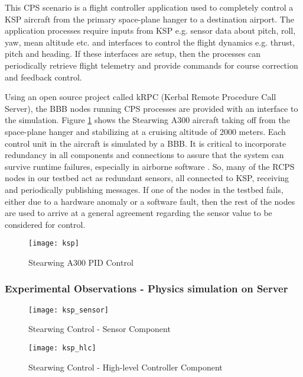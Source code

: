 This CPS scenario is a flight controller application used to completely control a KSP aircraft from the primary space-plane hanger to a destination airport. The application processes require inputs from KSP e.g. sensor data about pitch, roll, yaw, mean altitude etc. and interfaces to control the flight dynamics e.g. thrust, pitch and heading. If these interfaces are setup, then the processes can periodically retrieve flight telemetry and provide commands for course correction and feedback control.


Using an open source project called kRPC \cite{kRPC} (Kerbal Remote Procedure Call Server), the BBB nodes running CPS processes are provided with an interface to the simulation. Figure \ref{fig:ksp} shows the Stearwing A300 aircraft taking off from the space-plane hanger and stabilizing at a cruising altitude of 2000 meters. Each control unit in the aircraft is simulated by a BBB. It is critical to incorporate redundancy in all components and connections to assure that the system can survive runtime failures, especially in airborne software \cite{airborne_software} \cite{kornecki2004approaches}. So, many of the RCPS nodes in our testbed act as redundant sensors, all connected to KSP, receiving and periodically publishing messages. If one of the nodes in the testbed fails, either due to a hardware anomaly or a software fault, then the rest of the nodes are used to arrive at a general agreement regarding the sensor value to be considered for control.

\begin{figure}[h]
	\centering
	\texttt{[image: ksp]}
	\caption{Stearwing A300 PID Control}
	\label{fig:ksp}
\end{figure} 
\FloatBarrier 

\subsubsection{Experimental Observations - Physics simulation on Server}

\begin{figure}[h]
	\centering
	\texttt{[image: ksp\_sensor]}
	\caption{Stearwing Control - Sensor Component}
	\label{fig:sensor}
\end{figure} 
\FloatBarrier 

\begin{figure}[h]
	\centering
	\texttt{[image: ksp\_hlc]}
	\caption{Stearwing Control - High-level Controller Component}
	\label{fig:ksp_hlc}
\end{figure} 
\FloatBarrier 

